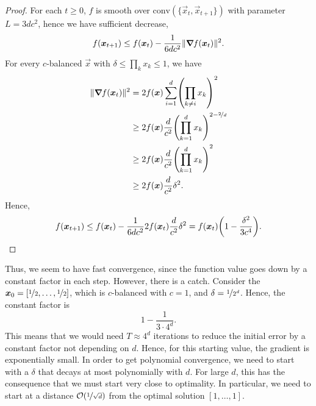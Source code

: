 \begin{proof}
    For each $t \geq 0$, $f$ is smooth over $\mathrm{conv}(\{ \vec{x}_t, \vec{x}_{t+1} \})$ with
    parameter $L = 3dc^2$, hence we have sufficient decrease, \[
        f(\vec{x}_{t+1}) \leq f(\vec{x}_t) - \frac{1}{6dc^2} \| \grad{f(\vec{x}_t)}{} \|^2.
    \]
    For every $c$-balanced $\vec{x}$ with $\delta \leq \prod_k x_k \leq 1$, we have
    \begin{align*}
        \| \grad{f(\vec{x}_t)}{} \|^2 & = 2f(\vec{x}) \sum_{i=1}^{d} \lft( \prod_{k \neq i} x_k \rgt)^2                      \\
                                      & \geq 2 f(\vec{x}) \frac{d}{c^2} \lft( \prod_{k=1}^{d} x_k \rgt)^{2- \nicefrac{2}{d}} \\
                                      & \geq 2 f(\vec{x}) \frac{d}{c^2} \lft( \prod_{k=1}^{d} x_k \rgt)^2                    \\
                                      & \geq 2 f(\vec{x}) \frac{d}{c^2} \delta^2.
    \end{align*}
    Hence, \[
        f(\vec{x}_{t+1}) \leq f(\vec{x}_t) - \frac{1}{6dc^2} 2 f(\vec{x}_t) \frac{d}{c^2}\delta^2 = f(\vec{x}_t) \lft( 1 - \frac{\delta^2}{3c^4} \rgt).
    \]
\end{proof}

Thus, we seem to have fast convergence, since the function value goes down by a constant factor in
each step. However, there is a catch. Consider the $\vec{x}_0 = [\nicefrac{1}{2}, \ldots,
    \nicefrac{1}{2}]$, which is $c$-balanced with $c=1$, and $\delta = \nicefrac{1}{2^d}$. Hence, the
constant factor is \[
    1 - \frac{1}{3\cdot 4^d}.
\]
This means that we would need $T \approx 4^d$ iterations to reduce the initial error by a constant
factor not depending on $d$. Hence, for this starting value, the gradient is exponentially small.
In order to get polynomial convergence, we need to start with a $\delta$ that decays at most
polynomially with $d$. For large $d$, this has the consequence that we must start very close to
optimality. In particular, we need to start at a distance $\bigo{\nicefrac{1}{\sqrt{d}}}$ from the
optimal solution $[1, \ldots, 1]$.

